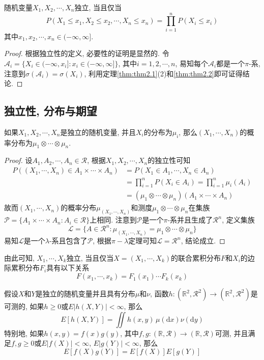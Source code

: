 \documentclass[cn, 12pt, math=mtpro2, bibstyle=apa, blue, twocol]{elegantbook}
\newcommand{\R}{\mathbb{R}}
\begin{document}
\begin{theorem}
随机变量$X_1,X_2,\cdots,X_n$独立, 当且仅当
$$P(X_1\leq x_1, X_2\leq x_2, \cdots,X_n\leq x_n)=\prod_{i=1}^{n}P(X_i\leq x_i)$$
其中$x_1,x_2,\cdots,x_n\in (-\infty,\infty]$.
\end{theorem}
\begin{proof}
  根据独立性的定义, 必要性的证明是显然的. 令$\mathcal{A}_i=\{X_i\in (-\infty,x_i]: x_i\in (-\infty,\infty]\}$, 其中$i=1,2,\cdots,n$, 易知每个$\mathcal{A}_i$都是一个$\pi$-系, 注意到$\sigma(\mathcal{A}_i)=\sigma(X_i)$, 利用定理\ref{thm:thm2.1}(2)和\ref{thm:thm2.2}即可证得结论.
\end{proof}

\subsection{独立性, 分布与期望}
\begin{theorem}
  如果$X_1,X_2,\cdots,X_n$是独立的随机变量, 并且$X_i$的分布为$\mu_i$, 那么$(X_1,\cdots,X_n)$的概率分布为$\mu_1\otimes\cdots\otimes\mu_n$.
\end{theorem}
\begin{proof}
  设$A_1,A_2,\cdots,A_n\in\mathcal{R}$, 根据$X_1,X_2,\cdots,X_n$的独立性可知
  \begin{align*}
  P((X_1,\cdots,X_n)\in A_1\times\cdots\times A_n)&=P(X_1\in A_1,\cdots,X_n\in A_n) \\
  &=\prod_{i=1}^{n}P(X_i\in A_i)=\prod_{i=1}^{n}\mu_i(A_i)\\
  &=(\mu_1\otimes\cdots\otimes\mu_n)(A_1\times\cdots\times A_n)
  \end{align*}
  故而$(X_1,\cdots,X_n)$的概率分布$\mu_{(X_1,\cdots,X_n)}$和测度$\mu_1\otimes\cdots\otimes\mu_n$在集族$\mathcal{P}=\{A_1\times\cdots\times A_n:A_i\in\mathcal{R}\}$上相同. 注意到$\mathcal{P}$是一个$\pi$-系并且生成了$\mathcal{R}^n$, 定义集族
  $$\mathcal{L}=\{A\in\mathcal{R}^n: \mu_{(X_1,\cdots,X_n)}=\mu_1\otimes\cdots\otimes\mu_n\}$$
  易知$\mathcal{L}$是一个$\lambda$-系且包含了$\mathcal{P}$, 根据$\pi-\lambda$定理可知$\mathcal{L}=\mathcal{R}^n$, 结论成立.

\end{proof}
\begin{remark}
由此可知, $X_1,\cdots,X_k$独立, 当且仅当$X=(X_1,\cdots,X_k)$的联合累积分布$F$和$X_i$的边际累积分布$F_i$具有以下关系
$$F(x_1,\cdots,x_k)=F_1(x_1)\cdots F_k(x_k)$$
\end{remark}
\begin{theorem}\label{thm:thm2.3}
  假设$X$和$Y$是独立的随机变量并且具有分布$\mu$和$\nu$, 函数$h:(\R^2,\mathcal{R}^2)\to (\R^2,\mathcal{R}^2)$是可测的, 如果$h\ge0$或$E|h(X,Y)|<\infty$, 那么
  $$E[h(X,Y)]=\iint h(x,y)\,\mu(\text{d}x)\nu(\text{d}y)$$
  特别地, 如果$h(x,y)=f(x)g(y)$, 其中$f,g:(\R,\mathcal{R})\to(\R,\mathcal{R})$可测, 并且满足$f,g\ge0$或$E|f(X)|<\infty$, $E|g(Y)|<\infty$, 那么
  $$E[f(X)g(Y)]=E[f(X)]E[g(Y)]$$
\end{theorem}
\end{document}
